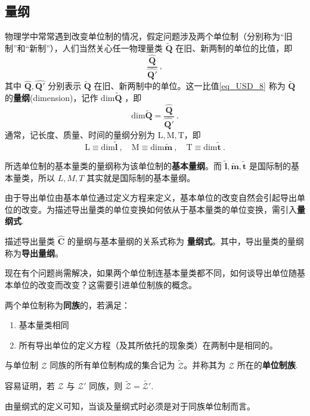 \subsection{量纲}
物理学中常常遇到改变单位制的情况，假定问题涉及两个单位制（分别称为“旧制”和“新制”），人们当然关心任一物理量类 $\tilde{\boldsymbol{Q}}$ 在旧、新两制的单位的比值，即 
\begin{equation}\label{eq_USD_8}
\frac{\hat{\boldsymbol{Q}}}{\hat{\boldsymbol{Q'}}}~,
\end{equation}
其中 $\hat{\boldsymbol{Q}},\hat{\boldsymbol{Q'}}$ 分别表示 $\tilde{\boldsymbol{Q}}$ 在旧、新两制中的单位。这一比值\autoref{eq_USD_8} 称为 $\tilde{\boldsymbol{Q}}$ 的\textbf{量纲}(dimension)，记作 $\mathrm{dim}\tilde{\boldsymbol{Q}}$ ，即
\begin{equation}\label{eq_USD_9}
\mathrm{dim}\tilde{\boldsymbol{Q}}=\frac{\hat{\boldsymbol{Q}}}{\hat{\boldsymbol{Q'}}}~.
\end{equation}
通常，记长度、质量、时间的量纲分别为 $\mathrm{L},\mathrm{M},\mathrm{T}$，即
\begin{equation}
\mathrm{L}\equiv\mathrm{dim}\tilde{\boldsymbol{l}}~,\quad\mathrm{M}\equiv\mathrm{dim}\tilde{\boldsymbol{m}}~,\quad
\mathrm{T}\equiv\mathrm{dim}\tilde{\boldsymbol{t}}~.
\end{equation}

所选单位制的基本量类的量纲称为该单位制的\textbf{基本量纲}。而 $\tilde{\boldsymbol{l}},\tilde{\boldsymbol{m}},\tilde{\boldsymbol{t}}$ 是国际制的基本量类，所以 $L,M,T$ 其实就是国际制的基本量纲。

由于导出单位由基本单位通过定义方程来定义，基本单位的改变自然会引起导出单位的改变。为描述导出量类的单位变换如何依从于基本量类的单位变换，需引入\textbf{量纲式}.
\begin{definition}{}\label{def_USD_1}
描述导出量类 $\hat{\boldsymbol{C}}$ 的量纲与基本量纲的关系式称为 \textbf{量纲式}。其中，导出量类的量纲称为\textbf{导出量纲}。
\end{definition}

现在有个问题尚需解决，如果两个单位制连基本量类都不同，如何谈导出单位随基本单位的改变而改变？这需要引进单位制族的概念。
\begin{definition}{}\label{def_USD_2}
两个单位制称为\textbf{同族}的，若满足：
\begin{enumerate}
\item 基本量类相同 
\item 所有导出单位的定义方程（及其所依托的现象类）在两制中是相同的。
\end{enumerate}
\end{definition}
与单位制 $\mathscr{Z}$ 同族的所有单位制构成的集合记为 $\tilde{\mathscr{Z}}$。并称其为 $\mathscr{Z}$ 所在的\textbf{单位制族}.

容易证明，若 $\mathscr{Z}$ 与 $\mathscr{Z'}$ 同族，则 $\tilde{\mathscr{Z}}=\tilde{\mathscr{Z'}}$.

由量纲式的定义可知，当谈及量纲式时必须是对于同族单位制而言。